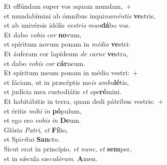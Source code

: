\evenverse Et effúndam super vos aquam mundam,~+\\\evenverse  et mundabímini ab ómnibus inqui\textit{na}\textit{mén}\textit{tis} \textbf{ve}stris,~\*\\
\evenverse et ab univérsis idólis \textit{ve}\textit{stris} \textit{mun}\textbf{dá}bo vos.\\
\oddverse Et dabo \textit{vo}\textit{bis} \textit{cor} \textbf{no}vum,~\*\\
\oddverse et spíritum novum ponam in \textit{mé}\textit{di}\textit{o} \textbf{ve}stri:\\
\evenverse Et áuferam cor lapídeum \textit{de} \textit{car}\textit{ne} \textbf{ve}stra,~\*\\
\evenverse et dabo \textit{vo}\textit{bis} \textit{cor} \textbf{cár}neum.\\
\oddverse Et spíritum meum ponam in médio vestri:~+\\
\oddverse  et fáciam, ut in præcéptis me\textit{is} \textit{am}\textit{bu}\textbf{lé}tis,~\*\\
\oddverse et judícia mea custodiátis \textit{et} \textit{o}\textit{pe}\textbf{ré}mini.\\
\evenverse Et habitábitis in terra, quam dedi pátribus vestris:~+\\
\evenverse  et éritis \textit{mi}\textit{hi} \textit{in} \textbf{pó}pulum,~\*\\
\evenverse et ego ero \textit{vo}\textit{bis} \textit{in} \textbf{De}um.\\
\oddverse Glória \textit{Pa}\textit{tri}, \textit{et} \textbf{Fí}lio,~\*\\
\oddverse et Spi\textit{rí}\textit{tu}\textit{i} \textbf{San}cto.\\
\evenverse Sicut erat in princípio, \textit{et} \textit{nunc}, \textit{et} \textbf{sem}per,~\*\\
\evenverse et in sǽcula sæ\textit{cu}\textit{ló}\textit{rum}. \textbf{A}men.\\
